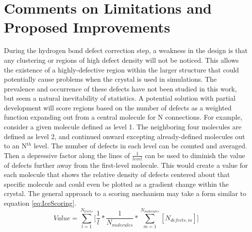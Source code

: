 \section{Comments on Limitations and Proposed Improvements}

During the hydrogen bond defect correction step, a weakness in the design is that any clustering or regions of high defect density will not be noticed.
This allows the existence of a highly-defective region within the larger structure that could potentially cause problems when the crystal is used in simulations. 
The prevalence and occurrence of these defects have not been studied in this work, but seem a natural inevitability of statistics. 
A potential solution with partial development will score regions based on the number of defects as a weighted function expanding out from a central molecule for N connections. 
For example, consider a given molecule defined as level 1. 
The neighboring four molecules are defined as level 2, and continued onward excepting already-defined molecules out to an N$^{th}$ level. 
The number of defects in each level can be counted and averaged.
Then a depressive factor along the lines of $\frac{1}{level}$ can be used to diminish the value of defects further away from the first-level molecule.
This would create a value for each molecule that shows the relative density of defects centered about that specific molecule and could even be plotted as a gradient change within the crystal.
The general approach to a scoring mechanism may take a form similar to equation \ref{eq:IceScoring}.
\begin{equation}
\label{eq:IceScoring}
Value = \sum_{l=1}^{N_{levels}} \Big[\frac{1}{l} * \frac{1} {N_{molecules}} *\sum_{m=1}^{N_{molecules}}[N_{defects, m}]\Big]
\end{equation}






